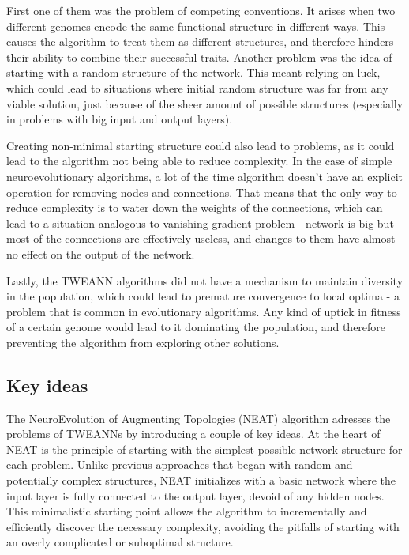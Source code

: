 \documentclass{article}
\begin{document}
First one of them was the problem of competing conventions. It arises when two different genomes encode the same
functional structure in different ways. This causes the algorithm to treat them as different structures, and therefore hinders
their ability to combine their successful traits.
Another problem was the idea of starting with a random structure of the network.
This meant relying on luck, which could lead to situations where initial random structure was far from any viable solution,
just because of the sheer amount of possible structures (especially in problems with big input and output layers).

Creating non-minimal starting structure could also lead to problems, as it could lead to the algorithm not being able to reduce complexity.
In the case of simple neuroevolutionary algorithms, a lot of the time algorithm doesn't have an explicit operation for removing nodes and
connections. That means that the only way to reduce complexity is to water down the weights of the connections, which can lead to a situation
analogous to vanishing gradient problem - network is big but most of the connections are effectively useless, and changes to them have 
almost no effect on the output of the network. 

Lastly, the TWEANN algorithms did not have a mechanism to maintain diversity in the population,
which could lead to premature convergence to local optima -  a problem that is common in evolutionary algorithms.
Any kind of uptick in fitness of a certain genome would lead to it dominating the population, and therefore preventing the algorithm from exploring other solutions.  

\subsection{Key ideas}
The NeuroEvolution of Augmenting Topologies (NEAT) algorithm adresses the problems of TWEANNs by introducing a couple of key ideas.
At the heart of NEAT is the principle of starting with the simplest possible network structure for each problem. Unlike previous
approaches that began with random and potentially complex structures, NEAT initializes with a basic network where the input
layer is fully connected to the output layer, devoid of any hidden nodes. This minimalistic starting point allows the algorithm
to incrementally and efficiently discover the necessary complexity, avoiding the pitfalls of starting with an overly complicated 
or suboptimal structure.
\end{document}
